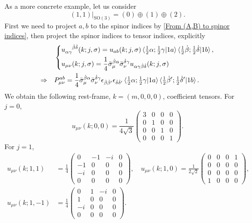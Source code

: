 As a more concrete example, let us consider
\begin{equation}
    (1, 1) \Big|_{\mathrm{SO}(3)} = (0) \oplus (1) \oplus (2).
\end{equation}
First we need to project $a, b$ to the spinor indices by \eqref{From (A,B) to spinor indices}, then project the spinor indices to tensor indices, explicitly
\begin{align}
    & \begin{dcases}
        \tensor{u}{_\alpha_\gamma^{\dot\beta}^{\dot\delta}}(k; j, \sigma) = u_{a b}(k; j, \sigma) \braket{\tfrac{1}{2} \alpha; \tfrac{1}{2} \gamma | 1 a} \braket{\tfrac{1}{2} \dot{\beta}; \tfrac{1}{2} \dot{\delta} | 1 b}, \\
        u_{\mu \nu}(k; j, \sigma) = \frac{1}{4} \bar{\sigma}^{\dot{\beta} \alpha}_\mu \bar{\sigma}^{\dot{\delta} \gamma}_\nu u_{\alpha \gamma \dot{\beta} \dot{\delta}}(k; j, \sigma)
    \end{dcases} \\
    \Rightarrow \quad & P^{a b}_{\mu \nu} = \frac{1}{4} \bar{\sigma}^{\dot{\beta} \alpha}_\mu \bar{\sigma}^{\dot{\delta} \gamma}_\nu \epsilon_{\dot{\beta} \dot{\beta}'} \epsilon_{\dot{\delta} \dot{\delta}'} \braket{\tfrac{1}{2} \alpha; \tfrac{1}{2} \gamma | 1 a} \braket{\tfrac{1}{2} \dot{\beta}'; \tfrac{1}{2} \dot{\delta}' | 1 b}.
\end{align}
We obtain the following rest-frame, $k = (m, 0, 0, 0)$, coefficient tensors. For $j = 0$,
\begin{equation}
    u_{\mu \nu}(k; 0, 0) = \frac{1}{4 \sqrt{3}} \begin{pmatrix}
        3 & 0 & 0 & 0 \\
        0 & 1 & 0 & 0 \\
        0 & 0 & 1 & 0 \\
        0 & 0 & 0 & 1
    \end{pmatrix}.
\end{equation}
For $j = 1$,
\begin{align}
    u_{\mu \nu}(k; 1, 1) &= \frac{1}{4} \begin{pmatrix}
        0 & - 1 & - i & 0 \\
        - 1 & 0 & 0 & 0 \\
        - i & 0 & 0 & 0 \\
        0 & 0 & 0 & 0
    \end{pmatrix}, \quad u_{\mu \nu}(k; 1, 0) = \frac{1}{2 \sqrt{2}} \begin{pmatrix}
        0 & 0 & 0 & 1 \\
        0 & 0 & 0 & 0 \\
        0 & 0 & 0 & 0 \\
        1 & 0 & 0 & 0
    \end{pmatrix}, \\
    u_{\mu \nu}(k; 1, - 1) &= \frac{1}{4} \begin{pmatrix}
        0 & 1 & - i & 0 \\
        1 & 0 & 0 & 0 \\
        - i & 0 & 0 & 0 \\
        0 & 0 & 0 & 0
    \end{pmatrix}.
\end{align}
